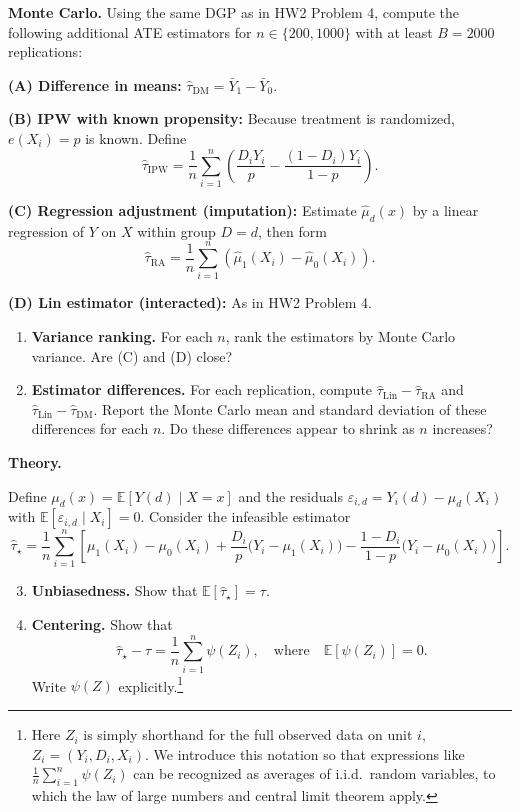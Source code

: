 \documentclass{article}
\newcommand{\E}{\mathbb{E}}
\theoremstyle{definition}
\begin{document}
\begin{enumerate}
\textbf{Monte Carlo.} Using the same DGP as in HW2 Problem 4, compute the following additional ATE estimators for $n\in\{200,1000\}$ with at least $B=2000$ replications:

\textbf{(A) Difference in means:} $\widehat{\tau}_{\mathrm{DM}} = \bar Y_1 - \bar Y_0$.

\textbf{(B) IPW with known propensity:} Because treatment is randomized, $e(X_i)=p$ is known. Define
\[
\widehat{\tau}_{\mathrm{IPW}}
=
\frac{1}{n}\sum_{i=1}^n
\left(\frac{D_i Y_i}{p} - \frac{(1-D_i)Y_i}{1-p}\right).
\]

\textbf{(C) Regression adjustment (imputation):} Estimate $\widehat{\mu}_d(x)$ by a linear regression of $Y$ on $X$ within group $D=d$, then form
\[
\widehat{\tau}_{\mathrm{RA}}
=
\frac{1}{n}\sum_{i=1}^n \left(\widehat{\mu}_1(X_i)-\widehat{\mu}_0(X_i)\right).
\]

\textbf{(D) Lin estimator (interacted):} As in HW2 Problem 4.

\begin{enumerate}
\item \textbf{Variance ranking.} For each $n$, rank the estimators by Monte Carlo variance. Are (C) and (D) close?

\item \textbf{Estimator differences.} For each replication, compute $\widehat{\tau}_{\mathrm{Lin}} - \widehat{\tau}_{\mathrm{RA}}$ and $\widehat{\tau}_{\mathrm{Lin}} - \widehat{\tau}_{\mathrm{DM}}$. Report the Monte Carlo mean and standard deviation of these differences for each $n$. Do these differences appear to shrink as $n$ increases?
\end{enumerate}

\textbf{Theory.}

Define $\mu_d(x)=\E[Y(d)\mid X=x]$ and the residuals $\varepsilon_{i,d} = Y_i(d) - \mu_d(X_i)$ with $\E[\varepsilon_{i,d}\mid X_i]=0$. Consider the infeasible estimator
\[
\widehat{\tau}_\star
=
\frac{1}{n}\sum_{i=1}^n
\left[
\mu_1(X_i)-\mu_0(X_i)
+
\frac{D_i}{p}\big(Y_i-\mu_1(X_i)\big)
-
\frac{1-D_i}{1-p}\big(Y_i-\mu_0(X_i)\big)
\right].
\]

\begin{enumerate}
\setcounter{enumi}{2}
\item \textbf{Unbiasedness.} Show that $\E[\widehat{\tau}_\star]=\tau$.

\item \textbf{Centering.} Show that
\[
\widehat{\tau}_\star-\tau
=
\frac{1}{n}\sum_{i=1}^n \psi(Z_i),
\quad\text{where}\quad
\E[\psi(Z_i)]=0.
\]
Write $\psi(Z)$ explicitly.\footnote{Here $Z_i$ is simply shorthand for the full observed data on unit $i$,
$Z_i=(Y_i,D_i,X_i)$.
We introduce this notation so that expressions like
$\frac{1}{n}\sum_{i=1}^n \psi(Z_i)$
can be recognized as averages of i.i.d.\ random variables, to which the law of large numbers and central limit theorem apply.}


\end{enumerate}
\end{enumerate}
\end{document}
